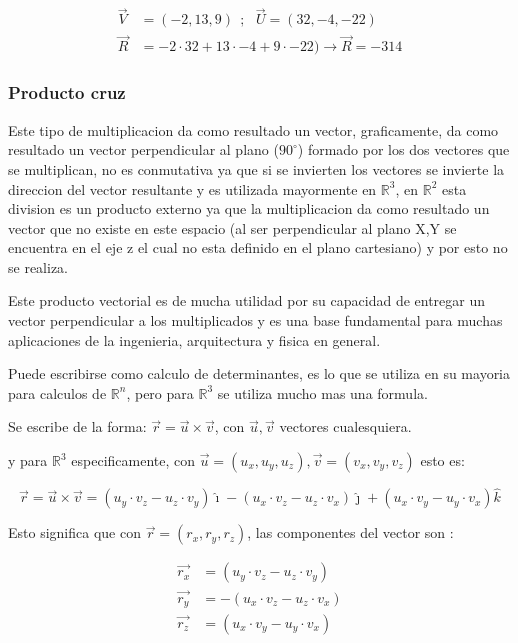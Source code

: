     \begin{align*}
        \vec{V}& =(-2,13,9)  \ \ ;\ \ \   \vec{U} =(32,-4,-22)		\\
        \vec{R}&= -2\cdot32 + 13\cdot-4 +9\cdot-22 )  \rightarrow \vec{R} = -314
    \end{align*}

    \subsubsection{Producto cruz}

    Este tipo de multiplicacion da como resultado un vector, graficamente, da
    como resultado un vector perpendicular al plano ($90^\circ$) formado por
    los dos vectores
    que se multiplican, no es conmutativa ya que si se invierten los vectores
    se invierte la direccion del vector resultante y es utilizada mayormente en
    $\mathbb{R}^3$, en $\mathbb{R}^2$ esta division es un producto externo ya
    que la multiplicacion da como resultado un vector que no existe en este espacio
    (al ser perpendicular al plano X,Y se encuentra en el eje z el cual no esta
    definido en el plano cartesiano) y por esto no se realiza.

    Este producto vectorial es de mucha utilidad por su capacidad de entregar
    un vector perpendicular a los multiplicados y es una base fundamental para
    muchas aplicaciones de la ingenieria, arquitectura y fisica en general.

    Puede escribirse como calculo de determinantes, es lo que se utiliza en su
    mayoria para calculos de $\mathbb{R}^n$, pero para $\mathbb{R}^3$ se utiliza
    mucho mas una formula.

    Se escribe de la forma: $\vec{r} = \vec{u}\times\vec{v}$, con
    $\vec{u},\vec{v}$ vectores cualesquiera.

    y para $\mathbb{R}^3$ especificamente, con $\vec{u}=(u_x,u_y,u_z),
    \vec{v}=(v_x,v_y,v_z)$ esto es:

    $$\vec{r} = \vec{u}\times\vec{v} =
        (u_y\cdot v_z- u_z\cdot v_y)\hat{\imath}
        - (u_x\cdot v_z- u_z\cdot v_x)\hat{\jmath}
        +  (u_x\cdot v_y- u_y\cdot v_x)\hat{k}
    $$

    Esto significa que con $\vec{r} = (r_x,r_y,r_z)$, las componentes del vector
    son :

    \begin{align*}
        \vec{r_x}& = (u_y\cdot v_z- u_z\cdot v_y)\\
        \vec{r_y}&= -(u_x\cdot v_z- u_z\cdot v_x)\\
        \vec{r_z}&= (u_x\cdot v_y- u_y\cdot v_x)
    \end{align*}

